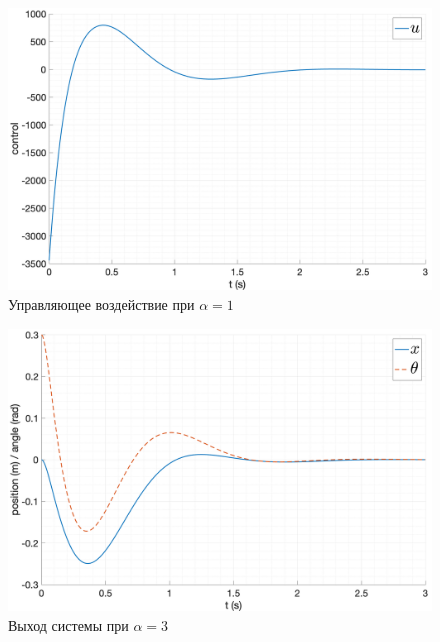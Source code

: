 \begin{figure}[ht!]
    \centering
    \includegraphics[width=\textwidth]{media/plots/nonmodal_controllers/u_1.png}
    \caption{Управляющее воздействие при $\alpha = 1$}
    \label{fig:nonmodal_control_alpha_1_u}
\end{figure}
\begin{figure}[ht!]
    \centering
    \includegraphics[width=\textwidth]{media/plots/nonmodal_controllers/out_2.png}
    \caption{Выход системы при $\alpha = 3$}
    \label{fig:nonmodal_control_alpha_2}
\end{figure}

